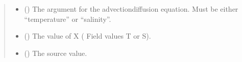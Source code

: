 \documentclass[a4paper,11pt,english,openany]{sphinxmanual}
\begin{document}
\begin{fulllineitems}
\begin{fulllineitems}
\end{fulllineitems}


\begin{fulllineitems}
\label{\detokenize{api/spyice.models.advection_diffusion:src.spyice.models.advection_diffusion.AdvectionDiffusion.__init__}}
\pysigstartsignatures
\pysiglinewithargsret
{}
{\sphinxparamcomma {}\sphinxparamcomma {}\sphinxparamcomma {}\sphinxparamcomma {}\sphinxparamcomma {}\sphinxparamcomma {}\sphinxparamcomma {}\sphinxparamcomma {}\sphinxparamcomma {}\sphinxparamcomma {}\sphinxparamcomma {}\sphinxparamcomma {}\sphinxparamcomma {}\sphinxparamcomma {}\sphinxparamcomma {}}
{}
\pysigstopsignatures\begin{quote}\begin{description}
\begin{itemize}
\item {} 
\sphinxAtStartPar
{} () \textendash{} The argument for the advection\sphinxhyphen{}diffusion equation. Must be either “temperature” or “salinity”.

\item {} 
\sphinxAtStartPar
{} () \textendash{} The value of X ( Field values T or S).

\item {} 
\sphinxAtStartPar
{} () \textendash{} The source value.


\end{itemize}
\end{description}
\end{quote}
\end{fulllineitems}
\end{fulllineitems}
\end{document}
